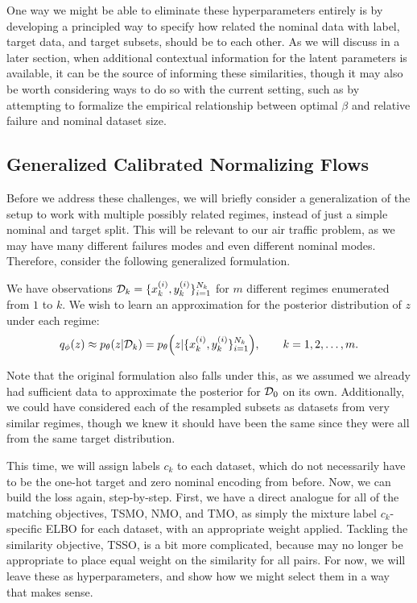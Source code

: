 One way we might be able to eliminate these hyperparameters entirely is by developing a principled way to specify how related the nominal data with label, target data, and target subsets, should be to each other. As we will discuss in a later section, when additional contextual information for the latent parameters is available, it can be the source of informing these similarities, though it may also be worth considering ways to do so with the current setting, such as by attempting to formalize the empirical relationship between optimal $\beta$ and relative failure and nominal dataset size.

\subsection{Generalized Calibrated Normalizing Flows}

Before we address these challenges, we will briefly consider a generalization of the \CALNF{} setup to work with multiple possibly related regimes, instead of just a simple nominal and target split. This will be relevant to our air traffic problem, as we may have many different failures modes and even different nominal modes. Therefore, consider the following generalized formulation.

\begin{example}
    We have observations $\mathcal D_k = \{x_k^{(i)}, y_k^{(i)}\}_{i=1}^{N_k}$ for $m$ different regimes enumerated from $1$ to $k$. We wish to learn an approximation for the posterior distribution of $z$ under each regime:
    \begin{equation}
        \qvd{z} \approx \pld{z\given \Data_k} = \pld{z\given \{x_k^{(i)}, y_k^{(i)}\}_{i=1}^{N_k}}, \qquad k=1,2,\ldots,m.
    \end{equation}
\end{example}

Note that the original formulation also falls under this, as we assumed we already had sufficient data to approximate the posterior for $\mathcal D_0$ on its own. Additionally, we could have considered each of the resampled subsets as datasets from very similar regimes, though we knew it should have been the same since they were all from the same target distribution. 

This time, we will assign labels $c_k$ to each dataset, which do not necessarily have to be the one-hot target and zero nominal encoding from before. Now, we can build the loss again, step-by-step. First, we have a direct analogue for all of the matching objectives, TSMO, NMO, and TMO, as simply the mixture label $c_k$-specific ELBO for each dataset, with an appropriate weight applied. Tackling the similarity objective, TSSO, is a bit more complicated, because may no longer be appropriate to place equal weight on the similarity for all pairs. For now, we will leave these as hyperparameters, and show how we might select them in a way that makes sense.

